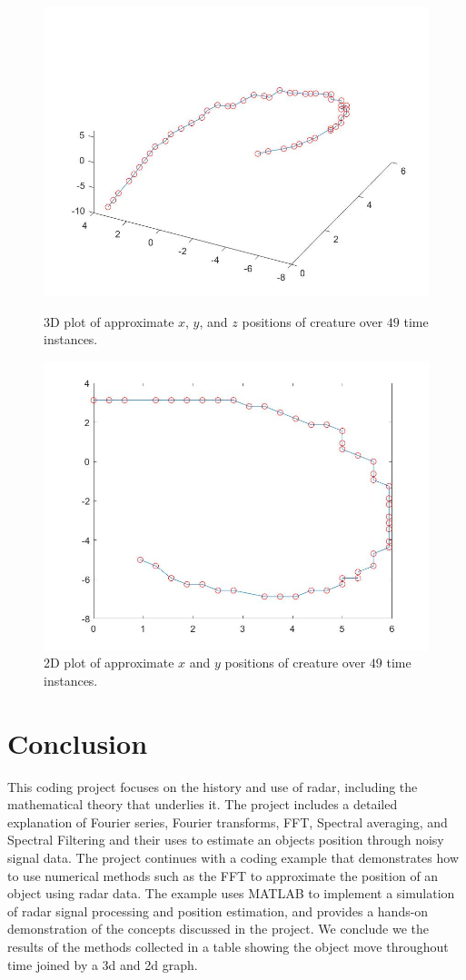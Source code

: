 \documentclass[12pt]{article}%
\numberwithin{equation}{subsection}
\begin{document}
\begin{figure}[H]
    \center
    \includegraphics[width = 0.6\linewidth]{3dlocations.jpg}
    \caption{3D plot of approximate $x$, $y$, and $z$ positions of creature over $49$ time instances.}
    \includegraphics[width = 0.6\linewidth]{2dlocations.jpg}
    \caption{2D plot of approximate $x$ and $y$ positions of creature over $49$ time instances.}\center
\end{figure}




\section{Conclusion}\label{Sec: Conclusion}

This coding project focuses on the history and use of radar, including the mathematical theory that underlies it. The project includes a detailed explanation of Fourier series, Fourier transforms, FFT, Spectral averaging, and Spectral Filtering and their uses to estimate an objects position through noisy signal data. The project continues with a coding example that demonstrates how to use numerical methods such as the FFT to approximate the position of an object using radar data. The example uses MATLAB to implement a simulation of radar signal processing and position estimation, and provides a hands-on demonstration of the concepts discussed in the project. We conclude we the results of the methods collected in a table showing the object move throughout time joined by a 3d and 2d graph. 
\end{document}
